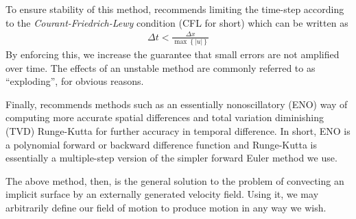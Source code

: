 To ensure stability of this method,  recommends
limiting the time-step according to the \emph{Courant-Friedrich-Lewy}
condition (CFL for short) which can be written as
\begin{eqnarray}
  \Delta t < \frac{\Delta x}{\max \left\lbrace \left| u \right| \right\rbrace}
\end{eqnarray}
By enforcing this, we increase the guarantee that small errors are not
amplified over time. The effects of an unstable method are commonly
referred to as ``exploding'', for obvious reasons.

Finally,  recommends methods such as an
essentially nonoscillatory (ENO) way of computing more accurate
spatial differences and total variation diminishing (TVD) Runge-Kutta
for further accuracy in temporal difference. In short, ENO is a
polynomial forward or backward difference function and Runge-Kutta is
essentially a multiple-step version of the simpler forward Euler
method we use.

The above method, then, is the general solution to the problem of
convecting an implicit surface by an externally generated velocity
field. Using it, we may arbitrarily define our field of motion to
produce motion in any way we wish.



